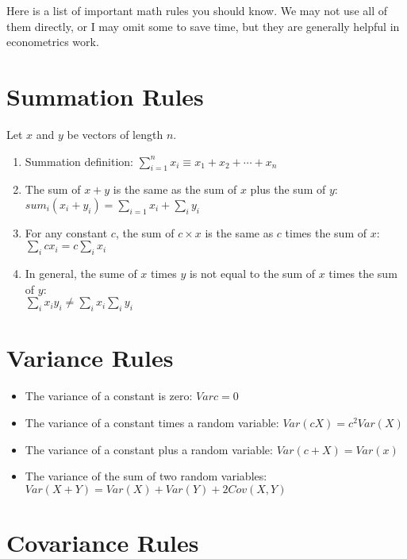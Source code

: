 \documentclass[11pt]{article}
\begin{document}
\pagestyle{fancy}
\selectfont

Here is a list of important math rules you should know. 
We may not use all of them directly, or I may omit some to save time, but they are generally helpful in econometrics work. 

\section*{Summation Rules}

Let $x$ and $y$ be vectors of length $n$. 

\begin{enumerate}
    \item Summation definition: $\sum_{i = 1}^{n} x_{i} \equiv x_{1} + x_{2} + \cdots + x_{n}$
    \item The sum of $x + y$ is the same as the sum of $x$ plus the sum of $y$: $sum_{i} (x_{i} + y_{i}) = \sum_{i=1} x_{i} + \sum_{i} y_{i}$
    \item For any constant $c$, the sum of $c \times x$ is the same as $c$ times the sum of $x$: $\sum_{i} cx_{i} = c \sum_{i} x_{i}$
    \item In general, the sume of $x$ times $y$ is not equal to the sum of $x$ times the sum of $y$: \\ $\sum_{i} x_{i}y_{i} \neq \sum_{i}x_{i} \sum_{i} y_{i}$
\end{enumerate}

\section*{Variance Rules}

\begin{itemize}
    \item The variance of a constant is zero: $Var{c} = 0$
    \item The variance of a constant times a random variable: $Var(cX) = c^{2}Var(X)$
    \item The variance of a constant plus a random variable: $Var(c + X) = Var(x)$
    \item The variance of the sum of two random variables: $Var(X + Y) = Var(X) + Var(Y) + 2Cov(X,Y)$
\end{itemize}

\section*{Covariance Rules}
\end{document}

